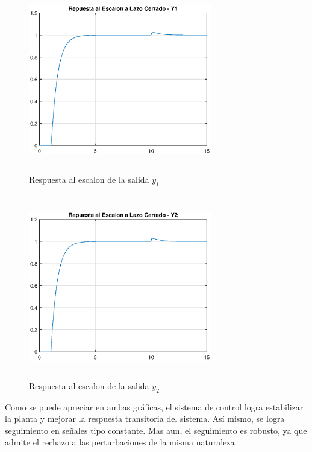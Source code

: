\documentclass[journal,twoside,web]{ieeecolor}
\begin{document}
	\begin{figure}[h]
		\begin{center}
			\includegraphics[width=8cm,height=8cm,keepaspectratio]{resp-cl-1}
			\caption{ Respuesta al escalon de la salida $y_1$ \label{control-system-cl-1}}
		\end{center}
	\end{figure}
	\begin{figure}[h]
		\begin{center}
			\includegraphics[width=8cm,height=8cm,keepaspectratio]{resp-cl-2}
			\caption{ Respuesta al escalon de la salida $y_2$ \label{control-system-cl-2}}
		\end{center}
	\end{figure}

	Como se puede apreciar en ambas gráficas, el sistema de control logra estabilizar la planta y mejorar la respuesta transitoria del sistema. Así mismo, se logra seguimiento en señales tipo constante. Mas aun, el seguimiento es robusto, ya que admite el rechazo a las perturbaciones de la misma naturaleza.
	
\end{document}
